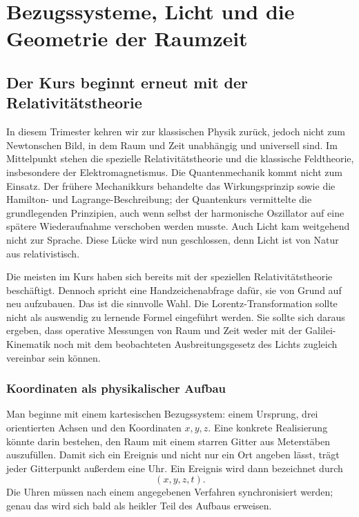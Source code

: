 \chapter{Bezugssysteme, Licht und die Geometrie der Raumzeit}

\section{Der Kurs beginnt erneut mit der Relativitätstheorie}

In diesem Trimester kehren wir zur klassischen Physik zurück, jedoch nicht zum Newtonschen Bild, in dem Raum und Zeit unabhängig und universell sind. Im Mittelpunkt stehen die spezielle Relativitätstheorie und die klassische Feldtheorie, insbesondere der Elektromagnetismus. Die Quantenmechanik kommt nicht zum Einsatz. Der frühere Mechanikkurs behandelte das Wirkungsprinzip sowie die Hamilton- und Lagrange-Beschreibung; der Quantenkurs vermittelte die grundlegenden Prinzipien, auch wenn selbst der harmonische Oszillator auf eine spätere Wiederaufnahme verschoben werden musste. Auch Licht kam weitgehend nicht zur Sprache. Diese Lücke wird nun geschlossen, denn Licht ist von Natur aus relativistisch.

Die meisten im Kurs haben sich bereits mit der speziellen Relativitätstheorie beschäftigt. Dennoch spricht eine Handzeichenabfrage dafür, sie von Grund auf neu aufzubauen. Das ist die sinnvolle Wahl. Die Lorentz-Transformation sollte nicht als auswendig zu lernende Formel eingeführt werden. Sie sollte sich daraus ergeben, dass operative Messungen von Raum und Zeit weder mit der Galilei-Kinematik noch mit dem beobachteten Ausbreitungsgesetz des Lichts zugleich vereinbar sein können.

\subsection{Koordinaten als physikalischer Aufbau}

Man beginne mit einem kartesischen Bezugssystem: einem Ursprung, drei orientierten Achsen und den Koordinaten \(x,y,z\). Eine konkrete Realisierung könnte darin bestehen, den Raum mit einem starren Gitter aus Meterstäben auszufüllen. Damit sich ein Ereignis und nicht nur ein Ort angeben lässt, trägt jeder Gitterpunkt außerdem eine Uhr. Ein Ereignis wird dann bezeichnet durch
\begin{equation}
(x,y,z,t).
\end{equation}
Die Uhren müssen nach einem angegebenen Verfahren synchronisiert werden; genau das wird sich bald als heikler Teil des Aufbaus erweisen.

